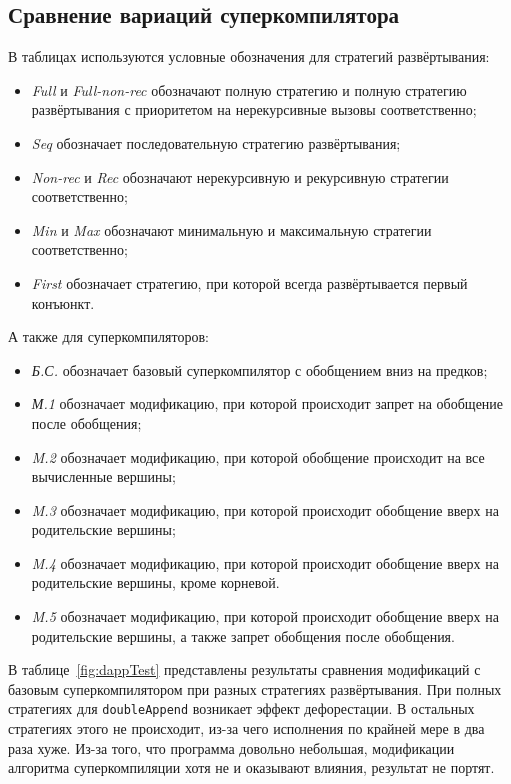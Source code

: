 \subsection{Сравнение вариаций суперкомпилятора \ukanren}

В таблицах используются условные обозначения для стратегий развёртывания:
\begin{itemize}
\item {\it Full} и {\it Full-non-rec} обозначают полную стратегию и полную стратегию развёртывания с приоритетом на нерекурсивные вызовы соответственно;
\item {\it Seq} обозначает последовательную стратегию развёртывания;
\item {\it Non-rec} и {\it Rec} обозначают нерекурсивную и рекурсивную стратегии соответственно;
\item {\it Min} и {\it Max} обозначают минимальную и максимальную стратегии соответственно;
\item {\it First} обозначает стратегию, при которой всегда развёртывается первый конъюнкт.
\end{itemize}

А также для суперкомпиляторов:
\begin{itemize}
\item {\it Б.С.} обозначает базовый суперкомпилятор с обобщением вниз на предков;
\item {\it М.1 } обозначает модификацию, при которой происходит запрет на обобщение после обобщения;
\item {\it M.2 } обозначает модификацию, при которой обобщение происходит на все вычисленные вершины;
\item {\it M.3 } обозначает модификацию, при которой происходит обобщение вверх на родительские вершины;
\item {\it M.4 } обозначает модификацию, при которой происходит обобщение вверх на родительские вершины, кроме корневой.
\item {\it M.5 } обозначает модификацию, при которой происходит обобщение вверх на родительские вершины, а также запрет обобщения после обобщения.
\end{itemize}


В таблице~\ref{fig:dappTest} представлены результаты сравнения модификаций
с базовым суперкомпилятором при разных стратегиях развёртывания.
При полных стратегиях для \lstinline{doubleAppend} возникает эффект дефорестации.
В остальных стратегиях этого не происходит, из-за чего исполнения по
крайней мере в два раза хуже. Из-за того, что программа довольно небольшая,
модификации алгоритма суперкомпиляции хотя не и оказывают влияния, результат не портят.


